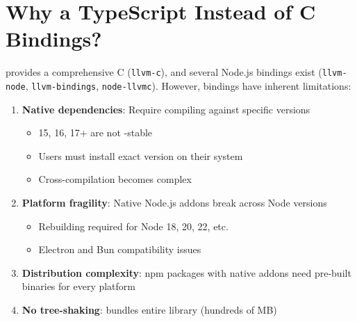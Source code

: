 \section{Why a TypeScript  Instead of C Bindings?}

 provides a comprehensive C  (\texttt{llvm-c}), and several Node.js bindings exist (\texttt{llvm-node}\cite{llvmnode}, \texttt{llvm-bindings}\cite{llvmbindings}, \texttt{node-llvmc}\cite{nodellvmc}). However,  bindings have inherent limitations:

\begin{enumerate}[noitemsep]
  \item \textbf{Native dependencies}: Require compiling against specific  versions
  \begin{itemize}[noitemsep]
    \item {} 15, 16, 17+ are not -stable
    \item Users must install exact  version on their system
    \item Cross-compilation becomes complex
  \end{itemize}

  \item \textbf{Platform fragility}: Native Node.js addons break across Node versions
  \begin{itemize}[noitemsep]
    \item Rebuilding required for Node 18, 20, 22, etc.
    \item Electron and Bun compatibility issues
  \end{itemize}

  \item \textbf{Distribution complexity}: npm packages with native addons need pre-built binaries for every platform

  \item \textbf{No tree-shaking}:  bundles entire  library (hundreds of MB)
\end{enumerate}
